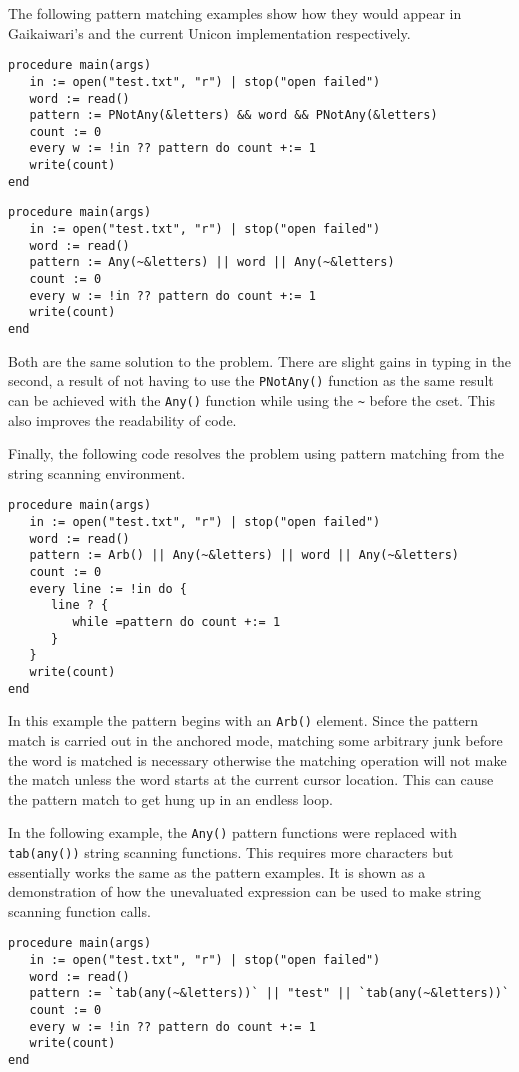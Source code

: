 \documentclass{article}
\begin{document}
The following pattern matching examples show how they would appear in Gaikaiwari's and the current Unicon implementation respectively.
\begin{verbatim}
procedure main(args)
   in := open("test.txt", "r") | stop("open failed")
   word := read()
   pattern := PNotAny(&letters) && word && PNotAny(&letters)
   count := 0
   every w := !in ?? pattern do count +:= 1
   write(count)
end
\end{verbatim}

\begin{verbatim}
procedure main(args)
   in := open("test.txt", "r") | stop("open failed")
   word := read()
   pattern := Any(~&letters) || word || Any(~&letters)
   count := 0
   every w := !in ?? pattern do count +:= 1
   write(count)
end
\end{verbatim}
Both are the same solution to the problem.  There are slight gains in typing in the second, a result of not having to use the \texttt{PNotAny()} function as the same result can be achieved with the \texttt{Any()} function while using the \texttt{\~} before the cset.  This also improves the readability of code.

Finally, the following code resolves the problem using pattern matching from the string scanning environment.
\begin{verbatim}
procedure main(args)
   in := open("test.txt", "r") | stop("open failed")
   word := read()
   pattern := Arb() || Any(~&letters) || word || Any(~&letters)
   count := 0
   every line := !in do {
      line ? {
         while =pattern do count +:= 1
      }
   }
   write(count)
end
\end{verbatim}
In this example the pattern begins with an \texttt{Arb()} element.  Since the pattern match is carried out in the anchored mode, matching some arbitrary junk before the word is matched is necessary otherwise the matching operation will not make the match unless the word starts at the current cursor location.  This can cause the pattern match to get hung up in an endless loop.

In the following example, the \texttt{Any()} pattern functions were replaced with \texttt{tab(any())} string scanning functions.  This requires more characters but essentially works the same as the pattern examples.  It is shown as a demonstration of how the unevaluated expression can be used to make string scanning function calls.
\begin{verbatim}
procedure main(args)
   in := open("test.txt", "r") | stop("open failed")
   word := read()
   pattern := `tab(any(~&letters))` || "test" || `tab(any(~&letters))`
   count := 0
   every w := !in ?? pattern do count +:= 1
   write(count)
end
\end{verbatim}
\end{document}

